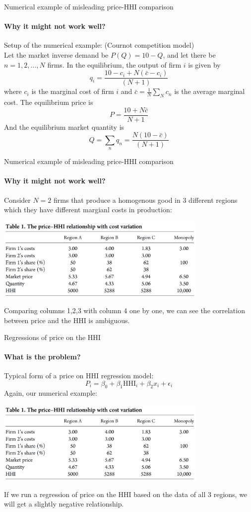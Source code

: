 \documentclass{beamer}
\begin{document}
\begin{frame}{Numerical example of misleading price-HHI comparison}
\framesubtitle{Why it might not work well?}
Setup of the numerical example: (Cournot competition model) \\
Let the market inverse demand be $P(Q) = 10 - Q$,  and let there be $n = 1,2, \dots, N$ firms. In the equilibrium, the output of firm $i$ is given by
$$
q_i =  \frac{10-c_i+N(\bar{c} - c_i)}{(N+1)}
$$
where $c_i$ is the marginal cost of firm $i$ and $\bar{c} = \frac{1}{N}\sum_{N}c_n$ is the average marginal cost. The equilibrium price is 
$$
P = \frac{10+N\bar{c}}{N+1}
$$ 
And the equilibrium market quantity is 
$$
Q = \sum_n q_n = \frac{N(10-\bar{c})}{(N+1)}
$$
\end{frame}

\begin{frame}{Numerical example of misleading price-HHI comparison}
\framesubtitle{Why it might not work well?}
Consider $N=2$ firms that produce a homogenous good in 3 different regions which they have different margianl costs in production:
\begin{center}
\includegraphics[height=4cm]{Tab1}
\end{center}
Comparing columns 1,2,3 with column  4 one by one, we can see the correlation between price and the HHI is ambiguous.
\end{frame}

\begin{frame}{Regressions of price on the HHI}
\framesubtitle{What is the problem?}
Typical form of a price on HHI regression model:\\
\begin{equation*}
P_i = \beta_0 + \beta_1\text{HHI}_{i} + \beta_2x_i + \epsilon_i
\end{equation*}
Again, our numerical example:
\begin{center}
\includegraphics[height=4cm]{Tab1}
\end{center}
If we run a regression of price on the HHI based on the data of all 3 regions, we will get a slightly negative relationship.
\end{frame}
\end{document}

